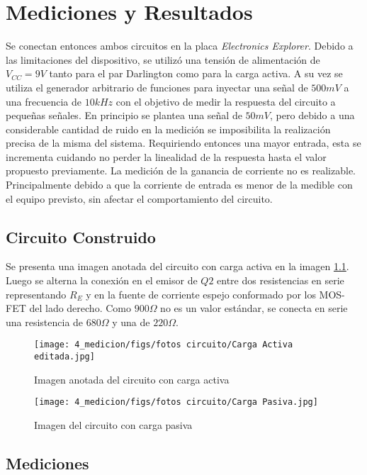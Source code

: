 \chapter{Mediciones y Resultados}
Se conectan entonces ambos circuitos en la placa \textit{Electronics Explorer}. Debido a las limitaciones del dispositivo, se utilizó una tensión de alimentación de $V_{CC} = 9V$ tanto para el par Darlington como para la carga activa.
A su vez se utiliza el generador arbitrario de funciones para inyectar una señal de $500 mV$ a una frecuencia de $10kHz$ con el objetivo de medir la respuesta del circuito a pequeñas señales. En principio se plantea una señal de $50 mV$, pero debido a una considerable cantidad de ruido en la medición se imposibilita la realización precisa de la misma del sistema.
Requiriendo entonces una mayor entrada, esta se incrementa cuidando no perder la linealidad de la respuesta hasta el valor propuesto previamente.
La medición de la ganancia de corriente no es realizable. Principalmente debido a que la corriente de entrada es menor de la medible con el equipo previsto, sin afectar el comportamiento del circuito.

\section{Circuito Construido}
Se presenta una imagen anotada del circuito con carga activa en la imagen \ref{fig: foto circuito carga activa}. Luego se alterna la conexión en el emisor de $Q2$ entre dos resistencias en serie representando $R_E$ y en la fuente de corriente espejo conformado por los MOS-FET del lado derecho. Como $900 \Omega$ no es un valor estándar, se conecta en serie una resistencia de $680 \Omega$ y una de $220 \Omega$.

\begin{figure}[H]
    \centering
    \texttt{[image: 4\_medicion/figs/fotos circuito/Carga Activa editada.jpg]}
    \caption{Imagen anotada del circuito con carga activa}
    \label{fig: foto circuito carga activa}
\end{figure}
\begin{figure}[H]
    \centering
    \texttt{[image: 4\_medicion/figs/fotos circuito/Carga Pasiva.jpg]}
    \caption{Imagen del circuito con carga pasiva}\label{fig: foto circuito carga pasiva}
\end{figure}


\section{Mediciones}


